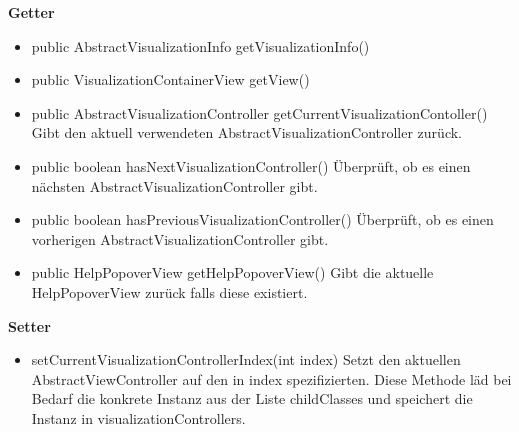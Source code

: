 \documentclass{article}
\begin{document}
      \textbf{Getter}
      \begin{itemize}
        \item public AbstractVisualizationInfo getVisualizationInfo()
        \item public VisualizationContainerView getView()
        \item public AbstractVisualizationController getCurrentVisualizationContoller() \newline
        Gibt den aktuell verwendeten AbstractVisualizationController zurück.
        \item public boolean hasNextVisualizationController() \newline
        Überprüft, ob es einen nächsten AbstractVisualizationController gibt.
        \item public boolean hasPreviousVisualizationController() \newline
        Überprüft, ob es einen vorherigen AbstractVisualizationController gibt.
        \item public HelpPopoverView getHelpPopoverView() \newline
        Gibt die aktuelle HelpPopoverView zurück falls diese existiert.
      \end{itemize}

      \textbf{Setter}
      \begin{itemize}
        \item setCurrentVisualizationControllerIndex(int index) \newline
        Setzt den aktuellen AbstractViewController auf den in index spezifizierten. Diese Methode läd bei Bedarf 
        die konkrete Instanz aus der Liste childClasses und speichert die Instanz in visualizationControllers.
      \end{itemize}
\end{document}
